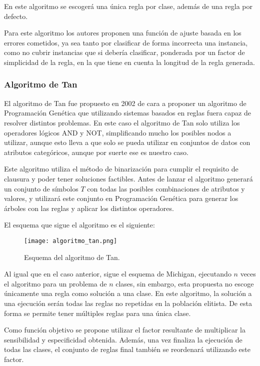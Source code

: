 En este algoritmo se escogerá una única regla por clase, además de una regla por defecto.

Para este algoritmo los autores proponen una función de ajuste basada en los errores cometidos, ya sea tanto por clasificar de forma incorrecta una instancia, como no cubrir instancias que si debería clasificar, ponderada por un factor de simplicidad de la regla, en la que tiene en cuenta la longitud de la regla generada.


\subsubsection{Algoritmo de Tan}

El algoritmo de Tan \cite{algoritmoTan} fue propuesto en 2002 de cara a proponer un algoritmo de Programación Genética que utilizando sistemas basados en reglas fuera capaz de resolver distintos problemas. En este caso el algoritmo de Tan solo utiliza los operadores lógicos AND y NOT, simplificando mucho los posibles nodos a utilizar, aunque esto lleva a que solo se pueda utilizar en conjuntos de datos con atributos categóricos, aunque por suerte ese es nuestro caso.

Este algoritmo utiliza el método de binarización para cumplir el requisito de clausura y poder tener soluciones factibles. Antes de lanzar el algoritmo generará un conjunto de símbolos $T$ con todas las posibles combinaciones de atributos y valores, y utilizará este conjunto en Programación Genética para generar los árboles con las reglas y aplicar los distintos operadores.

El esquema que sigue el algoritmo es el siguiente:

\begin{figure}[H]
    \centering
	  \texttt{[image: algoritmo\_tan.png]}
    \caption{Esquema del algoritmo de Tan.}
	 \label{fig:algoritmo_tan}
\end{figure}

Al igual que en el caso anterior, sigue el esquema de Michigan, ejecutando $n$ veces el algoritmo para un problema de $n$ clases, sin embargo, esta propuesta no escoge únicamente una regla como solución a una clase. En este algoritmo, la solución a una ejecución serán todas las reglas no repetidas en la población elitista. De esta forma se permite tener múltiples reglas para una única clase.

Como función objetivo se propone utilizar el factor resultante de multiplicar la sensibilidad y especificidad obtenida. Además, una vez finaliza la ejecución de todas las clases, el conjunto de reglas final también se reordenará utilizando este factor.

